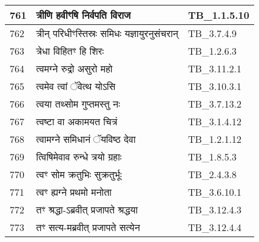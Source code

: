 \documentclass[17pt]{extarticle}
\begin{document}
\begin{longtable}{||p{0.4in}||p{4.9in}||p{0.9in}||}
    \hline
        
    761 & त्रीणि हवीꣳषि निर्वपति विराज & TB\_1.1.5.10       \\
    
    \hline
        
    762 & त्रीन् परिधीꣳस्तिस्रः समिधः यज्ञायुरनुसंचरान् & TB\_3.7.4.9       \\
    
    \hline
        
    763 & त्रेधा विहितꣳ हि शिरः & TB\_1.2.6.3       \\
    
    \hline
        
    764 & त्वमग्ने रुद्रो असुरो महो & TB\_3.11.2.1       \\
    
    \hline
        
    765 & त्वमेव त्वां ॅवेत्थ योऽसि & TB\_3.10.3.1       \\
    
    \hline
        
    766 & त्वया तथ्सोम गुप्तमस्तु नः & TB\_3.7.13.2       \\
    
    \hline
        
    767 & त्वष्टा वा अकामयत चित्रं & TB\_3.1.4.12       \\
    
    \hline
        
    768 & त्वामग्ने समिधानं ॅयविष्ठ देवा & TB\_1.2.1.12       \\
    
    \hline
        
    769 & त्विषिमेवाव रुन्धे त्रयो ग्रहाः & TB\_1.8.5.3       \\
    
    \hline
        
    770 & त्वꣳ सोम क्रतुभिः सुक्रतुर्भूः & TB\_2.4.3.8       \\
    
    \hline
        
    771 & त्वꣳ ह्यग्ने प्रथमो मनोता & TB\_3.6.10.1       \\
    
    \hline
        
    772 & तꣳ श्रद्धा{-}ऽब्रवीत् प्रजापते श्रद्धया & TB\_3.12.4.3       \\
    
    \hline
        
    773 & तꣳ सत्य{-}मब्रवीत् प्रजापते सत्येन & TB\_3.12.4.4       \\
    

\end{longtable}
\end{document}
